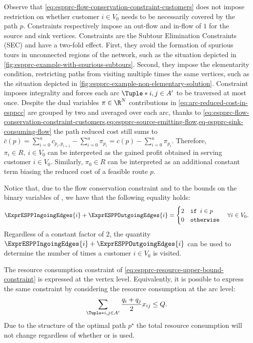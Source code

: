 Observe that \cref{eq:espprc-flow-conservation-constraint-customers} does not impose
restriction on whether customer $i \in V_0$ needs to be necessarily covered by the path $p$.
Constraints 
respectively impose an out-flow and in-flow of $1$ for the source and sink vertices.
Constraints  are the Subtour Elimination Constraints (SEC) and
have a two-fold effect.
First, they avoid the formation of spurious tours in unconnected regions of the network, such
as the situation depicted in \cref{fig:espprc-example-with-spurious-subtours}.
Second, they impose the elementarity condition, restricting paths from visiting multiple times
the same vertices, such as the situation depicted in \cref{fig:espprc-example-non-elementary-solution}.
Constraint  imposes integrality
and forces each arc $\Tuple*{i, j} \in A^\prime$ to be traversed at most once.
Despite the dual variables $\pi \in \R^N$ contributions in \cref{eq:arc-reduced-cost-in-esppcc}
are grouped by two and averaged over each arc,
thanks to \cref{eq:espprc-flow-conservation-constraint-customers,eq:espprc-source-emitting-flow,eq-espprc-sink-consuming-flow}
the path reduced cost still sums to
$\bar{c}(p) = \sum_{i=0}^{u} c_{p_i,p_{i+1}} - \sum_{i=0}^{u} \pi_{p_i} = c(p) - \sum_{i=0}^{u} \pi_{p_i}$.
Therefore, $\pi_i \in R,\ i \in V_0$ can be interpreted as the gained profit obtained in serving customer $i \in V_0$.
Similarly, $\pi_0 \in R$ can be interpreted as an additional constant term biasing the reduced cost of a feasible route $p$.

\medskip

Notice that, due to the flow conservation constraint and to the bounds on the binary variables of
,
we have that the following equality holds:
\begin{equation}
	\ExprESPPIngoingEdges{i} + \ExprESPPOutgoingEdges{i} = \begin{cases}
		2 & \texttt{if } i \in p \\
		0 & \texttt{otherwise}
	\end{cases}
	\quad \forall i \in V_0.
\end{equation}
Regardless of a constant factor of $2$,
the quantity $\ExprESPPIngoingEdges{i} + \ExprESPPOutgoingEdges{i}$
can be used to determine the number of times a  customer $i \in V_0$ is visited.

The resource consumption constraint of \cref{eq:espprc-resource-upper-bound-constraint} is
expressed at the vertex level.
Equivalently, it is possible to express the same constraint by considering the resource consumption
at the arc level:
\begin{equation}
	\label{eq:espprc-resource-upper-bound-constraint-arc-level}
	\sum_{\Tuple*{i, j} \in A^\prime} \frac{q_i + q_j}{2} x_{ij} \le Q.
\end{equation}
Due to the structure of the optimal path $p^\star$ the total resource consumption
will not change regardless of whether
or 
is used.

